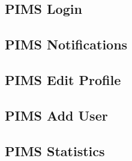 \documentclass[a4paper,12pt,titlepage,margin=1in]{article}
\begin{document}
	\subsection{PIMS Login}
	
	\subsection{PIMS Notifications}
	
	\subsection{PIMS Edit Profile}
	
	\subsection{PIMS Add User}
	
	\subsection{PIMS Statistics}
	
	
\end{document}
